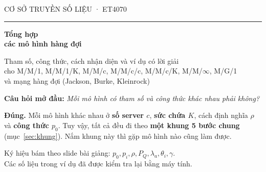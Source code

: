 \documentclass[11pt,a4paper]{article}
\begin{document}
\begin{titlepage}
\thispagestyle{empty}
\vspace*{3.2cm}
{\sffamily\color{accent!80}\large CƠ SỞ TRUYỀN SỐ LIỆU · ET4070}\par\vspace{0.6em}
{\color{accent}\rule{0.35\linewidth}{2pt}}\par\vspace{1.4em}
{\sffamily\bfseries\fontsize{34}{40}\selectfont\color{ink} Tổng hợp\\[0.15em] các mô hình hàng đợi\par}
\vspace{1.4em}
{\large Tham số, công thức, cách nhận diện và ví dụ có lời giải\\
cho M/M/1, M/M/1/K, M/M/c, M/M/c/c, M/M/c/K, M/M/$\infty$, M/G/1\\
và mạng hàng đợi (Jackson, Burke, Kleinrock)\par}
\vfill
\begin{tcolorbox}[common,colback=accentsoft,colframe=accent,width=\linewidth]
\textbf{Câu hỏi mở đầu:} \emph{Mỗi mô hình có tham số và công thức khác nhau phải không?}\par
\textbf{Đúng.} Mỗi mô hình khác nhau ở \textbf{số server $c$}, \textbf{sức chứa $K$}, cách định nghĩa \textbf{$\rho$} và \textbf{công thức $p_0$}. Tuy vậy, tất cả đều đi theo \textbf{một khung 5 bước chung} (mục~\ref{sec:khung}). Nắm khung này thì gặp mô hình nào cũng làm được.
\end{tcolorbox}
\vspace{1cm}
{\small\color{ink!70} Ký hiệu bám theo slide bài giảng: $p_0, p_i, \rho, P_Q, \lambda_a, \theta_i, \gamma$.\\
Các số liệu trong ví dụ đã được kiểm tra lại bằng máy tính.}
\end{titlepage}

\tableofcontents
\newpage








\end{document}

